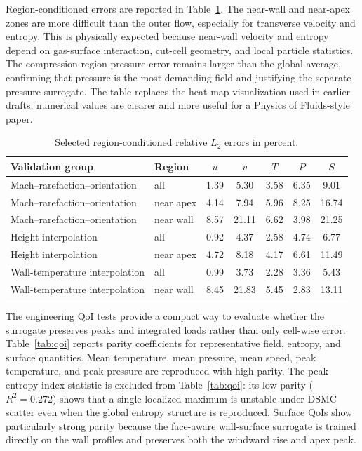 \documentclass[aip,pof,preprint,floatfix,amsmath,amssymb]{revtex4-2}
\begin{document}
Region-conditioned errors are reported in Table~\ref{tab:region}. The near-wall and near-apex zones are more difficult than the outer flow, especially for transverse velocity and entropy. This is physically expected because near-wall velocity and entropy depend on gas-surface interaction, cut-cell geometry, and local particle statistics. The compression-region pressure error remains larger than the global average, confirming that pressure is the most demanding field and justifying the separate pressure surrogate. The table replaces the heat-map visualization used in earlier drafts; numerical values are clearer and more useful for a Physics of Fluids-style paper.

\begin{table}[t]
\centering
\caption{Selected region-conditioned relative $L_2$ errors in percent.}
\label{tab:region}
\begin{tabular}{llccccc}
\toprule
Validation group & Region & $u$ & $v$ & $T$ & $P$ & $S$ \\
\midrule
Mach--rarefaction--orientation & all & 1.39 & 5.30 & 3.58 & 6.35 & 9.01 \\
Mach--rarefaction--orientation & near apex & 4.14 & 7.94 & 5.96 & 8.25 & 16.74 \\
Mach--rarefaction--orientation & near wall & 8.57 & 21.11 & 6.62 & 3.98 & 21.25 \\
Height interpolation & all & 0.92 & 4.37 & 2.58 & 4.74 & 6.77 \\
Height interpolation & near apex & 4.72 & 8.18 & 4.17 & 6.61 & 11.49 \\
Wall-temperature interpolation & all & 0.99 & 3.73 & 2.28 & 3.36 & 5.43 \\
Wall-temperature interpolation & near wall & 8.45 & 21.83 & 5.45 & 2.83 & 13.11 \\
\bottomrule
\end{tabular}
\end{table}

The engineering QoI tests provide a compact way to evaluate whether the surrogate preserves peaks and integrated loads rather than only cell-wise error. Table~\ref{tab:qoi} reports parity coefficients for representative field, entropy, and surface quantities. Mean temperature, mean pressure, mean speed, peak temperature, and peak pressure are reproduced with high parity. The peak entropy-index statistic is excluded from Table~\ref{tab:qoi}: its low parity ($R^2=0.272$) shows that a single localized maximum is unstable under DSMC scatter even when the global entropy structure is reproduced. Surface QoIs show particularly strong parity because the face-aware wall-surface surrogate is trained directly on the wall profiles and preserves both the windward rise and apex peak.
\end{document}
